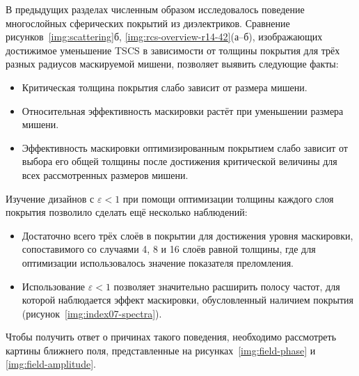 В предыдущих разделах численным образом исследовалось поведение
многослойных сферических покрытий из диэлектриков. Сравнение
рисунков~\ref{img:scattering}б, \ref{img:rcs-overview-r14-42}(а--б),
изображающих достижимое уменьшение TSCS в зависимости от толщины
покрытия для трёх разных радиусов маскируемой мишени, позволяет
выявить следующие факты:
\begin{itemize}
\item Критическая толщина покрытия слабо зависит от размера мишени.
\item Относительная эффективность маскировки растёт при уменьшении
  размера мишени.
\item Эффективность маскировки оптимизированным покрытием слабо зависит
  от выбора его общей толщины после достижения критической
  величины для всех рассмотренных размеров мишени.
\end{itemize}
Изучение дизайнов с ${\varepsilon<1}$ при помощи  оптимизации
толщины каждого слоя покрытия позволило сделать ещё несколько
наблюдений:
\begin{itemize}
\item Достаточно всего трёх слоёв в покрытии для достижения уровня
  маскировки, сопоставимого со случаями 4, 8 и 16 слоёв равной толщины,
  где для оптимизации использовалось значение показателя преломления.
\item Использование ${\varepsilon<1}$ позволяет значительно расширить
  полосу частот, для которой наблюдается эффект маскировки,
  обусловленный наличием покрытия (рисунок~\ref{img:index07-spectra}).
\end{itemize}
Чтобы получить ответ о причинах такого поведения, необходимо
рассмотреть картины ближнего поля, представленные на
рисунках~\ref{img:field-phase} и \ref{img:field-amplitude}.

